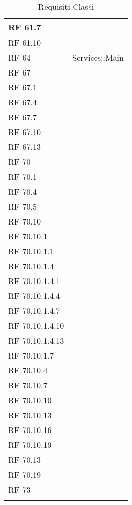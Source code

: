 \begin{center}
\begin{longtable}{ | p{2cm} | p{12cm} | }
 \hline 
RF 61.7 & \\ 
 \hline 
RF 61.10 & \\ 
 \hline 
RF 64 & Services::Main \\ 
 \hline 
RF 67 & \\ 
 \hline 
RF 67.1 & \\ 
 \hline 
RF 67.4 & \\ 
 \hline 
RF 67.7 & \\ 
 \hline 
RF 67.10 & \\ 
 \hline 
RF 67.13 & \\ 
 \hline 
RF 70 & \\ 
 \hline 
RF 70.1 & \\ 
 \hline 
RF 70.4 & \\ 
 \hline 
RF 70.5 & \\ 
 \hline 
RF 70.10 & \\ 
 \hline 
RF 70.10.1 & \\ 
 \hline 
RF 70.10.1.1 & \\ 
 \hline 
RF 70.10.1.4 & \\ 
 \hline 
RF 70.10.1.4.1 & \\ 
 \hline 
RF 70.10.1.4.4 & \\ 
 \hline 
RF 70.10.1.4.7 & \\ 
 \hline 
RF 70.10.1.4.10 & \\ 
 \hline 
RF 70.10.1.4.13 & \\ 
 \hline 
RF 70.10.1.7 & \\ 
 \hline 
RF 70.10.4 & \\ 
 \hline 
RF 70.10.7 & \\ 
 \hline 
RF 70.10.10 & \\ 
 \hline 
RF 70.10.13 & \\ 
 \hline 
RF 70.10.16 & \\ 
 \hline 
RF 70.10.19 & \\ 
 \hline 
RF 70.13 & \\ 
 \hline 
RF 70.19 & \\ 
 \hline 
RF 73 & \\
   \hline

\caption{Requisiti-Classi}
\end{longtable}
\egroup
\end{center}


